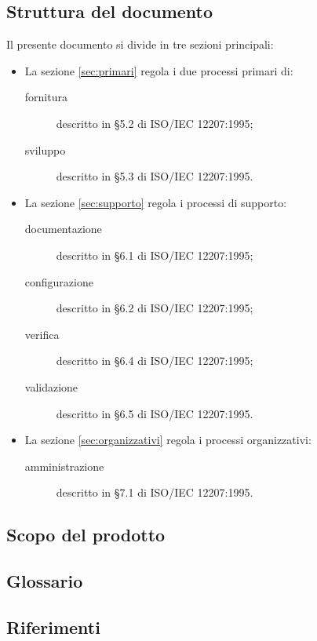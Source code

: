 \subsection{Struttura del documento}
Il presente documento si divide in tre sezioni principali:
\begin{itemize}
	\item La sezione \ref{sec:primari} regola i due processi primari di:
	\begin{description}
		\item[fornitura] descritto in §5.2 di ISO/IEC 12207:1995;
		\item[sviluppo] descritto in §5.3 di ISO/IEC 12207:1995.
	\end{description}
	\item La sezione \ref{sec:supporto} regola i processi di supporto:
	\begin{description}
		\item[documentazione] descritto in §6.1 di ISO/IEC 12207:1995;
		\item[configurazione] descritto in §6.2 di ISO/IEC 12207:1995;
		\item[verifica] descritto in §6.4 di ISO/IEC 12207:1995;
		\item[validazione] descritto in §6.5 di ISO/IEC 12207:1995.
	\end{description}
	\item La sezione \ref{sec:organizzativi} regola i processi organizzativi:
	\begin{description}
		\item[amministrazione] descritto in §7.1 di ISO/IEC 12207:1995.
	\end{description}
\end{itemize}


\subsection{Scopo del prodotto}
\scopo


\subsection{Glossario}
\presgloss


\subsection{Riferimenti} \label{sec:ref}

